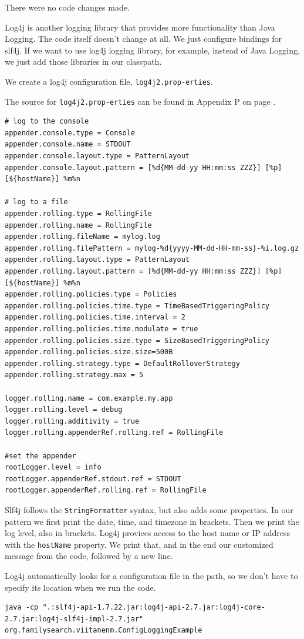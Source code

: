 There were no code changes made.

Log4j is another logging library that provides more functionality than Java Logging. The code itself doesn't change at all. We just configure bindings for slf4j. If we want to use log4j logging library, for example, instead of Java Logging, we just add those libraries in our classpath.

We create a log4j configuration file, \texttt{log4j2.prop\hyp{}erties}. 

The source for \texttt{log4j2.prop\hyp{}erties} can be found in Appendix P on page \pageref{App:AppendixP}.
\begin{lstlisting}
# log to the console
appender.console.type = Console
appender.console.name = STDOUT
appender.console.layout.type = PatternLayout
appender.console.layout.pattern = [%d{MM-dd-yy HH:mm:ss ZZZ}] [%p] [${hostName}] %m%n

# log to a file
appender.rolling.type = RollingFile
appender.rolling.name = RollingFile
appender.rolling.fileName = mylog.log
appender.rolling.filePattern = mylog-%d{yyyy-MM-dd-HH-mm-ss}-%i.log.gz
appender.rolling.layout.type = PatternLayout
appender.rolling.layout.pattern = [%d{MM-dd-yy HH:mm:ss ZZZ}] [%p] [${hostName}] %m%n
appender.rolling.policies.type = Policies
appender.rolling.policies.time.type = TimeBasedTriggeringPolicy
appender.rolling.policies.time.interval = 2
appender.rolling.policies.time.modulate = true
appender.rolling.policies.size.type = SizeBasedTriggeringPolicy
appender.rolling.policies.size.size=500B
appender.rolling.strategy.type = DefaultRolloverStrategy
appender.rolling.strategy.max = 5
 
logger.rolling.name = com.example.my.app
logger.rolling.level = debug
logger.rolling.additivity = true
logger.rolling.appenderRef.rolling.ref = RollingFile

#set the appender
rootLogger.level = info
rootLogger.appenderRef.stdout.ref = STDOUT
rootLogger.appenderRef.rolling.ref = RollingFile
\end{lstlisting}

Slf4j follows the \texttt{StringFormatter} syntax, but also adds some properties. In our pattern we first print the date, time, and timezone in brackets. Then we print the log level, also in brackets. Log4j provices access to the host name or IP address with the \texttt{hostName} property. We print that, and in the end our customized message from the code, followed by a new line.

Log4j automatically looks for a configuration file in the path, so we don't have to specify its location when we run the code.
\begin{lstlisting}
java -cp ".:slf4j-api-1.7.22.jar:log4j-api-2.7.jar:log4j-core-2.7.jar:log4j-slf4j-impl-2.7.jar"  org.familysearch.viitanenm.ConfigLoggingExample
\end{lstlisting}

